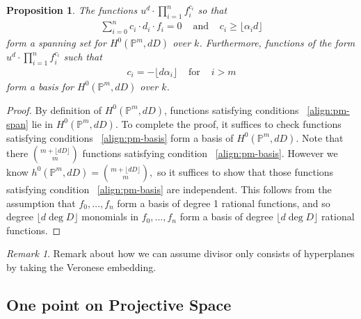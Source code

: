 \documentclass{amsart}
\theoremstyle{plain}
\newtheorem{prop}[thm]{Proposition}
\theoremstyle{definition}
\theoremstyle{remark}
\newtheorem{rem}[thm]{Remark}
\numberwithin{equation}{section}
\newcommand\ssec{\subsection}
\newcommand\bp{{\mathbb P}}
\begin{document}
\begin{prop}
\label{prop:pm-span-and-basis}
The functions $u^d \cdot \prod_{i=1}^n f_i^{c_i}$ so that 
\begin{align}
\label{align:pm-span}
\sum_{i=0}^{n} c_i \cdot d_i \cdot f_i = 0 & \text{ and } &c_i \geq \lfloor \alpha_i d\rfloor	
\end{align}
form a spanning set for $H^0(\bp^m, dD)$ over $k$. Furthermore, functions 
of the form $u^d \cdot \prod_{i=1}^n f_i^{c_i} $ such that
\begin{align}
\label{align:pm-basis}
c_i = -\lfloor d\alpha_i \rfloor & \text{ for } & i > m
\end{align}
form a basis for $H^0(\bp^m, dD)$ over $k$.
\end{prop}
\begin{proof}
By definition of $H^0(\bp^m,dD)$, functions satisfying conditions 
~\eqref{align:pm-span} lie in $H^0(\bp^m,dD)$. To complete the proof, it suffices to check functions satisfying conditions ~\eqref{align:pm-basis} form a basis of $H^0(\bp^m,dD)$. Note that there $\binom{m+ \lfloor dD \rfloor }{m}$ functions satisfying condition ~\eqref{align:pm-basis}. However we know $h^0(\bp^m,dD) = \binom{m+ \lfloor dD \rfloor }{m},$ so it suffices to show that those functions satisfying condition ~\eqref{align:pm-basis} are independent. This follows from the assumption that $f_0,\ldots, f_n$ form a basis of degree 1 rational functions, and so degree $\lfloor d \deg D \rfloor $ monomials in $f_0,\ldots, f_n$ form a basis of degree $\lfloor d \deg D \rfloor $ rational functions.
\end{proof}

\begin{rem}
Remark about how we can assume divisor only consists of hyperplanes
by taking the Veronese embedding.
\end{rem}

\ssec{One point on Projective Space}
\label{ssec:proj-one-point}
\end{document}
